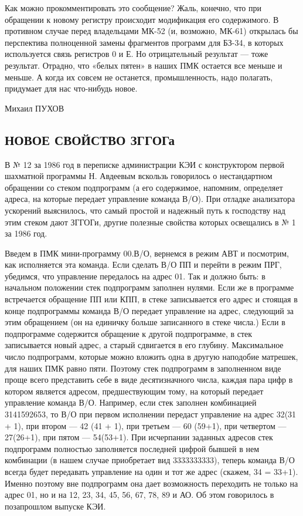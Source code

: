 \documentclass[11pt,a4paper,oneside]{article}
\begin{document}
Как можно прокомментировать это сообщение? Жаль, конечно, что при обращении к новому регистру происходит модификация его содержимого. В противном случае перед владельцами МК-52 (и, возможно, МК-61) открылась бы перспектива полноценной замены фрагментов программ для БЗ-34, в которых используется связь регистров 0 и Е. Но отрицательный результат — тоже результат. Отрадно, что «белых пятен» в наших ПМК остается все меньше и меньше. А когда их совсем не останется, промышленность, надо полагать, придумает для нас что-нибудь новое.

Михаил ПУХОВ

\subsection{НОВОЕ СВОЙСТВО ЗГГОГа}
В № 12 за 1986 год в переписке администрации КЭИ с конструктором первой шахматной программы Н. Авдеевым вскользь говорилось о нестандартном обращении со стеком подпрограмм (а его содержимое, напомним, определяет адреса, на которые передает управление команда В/О). При отладке анализатора ускорений выяснилось, что самый простой и надежный путь к господству над этим стеком дают ЗГГОГи, другие полезные свойства которых освещались в № 1 за 1986 год.

Введем в ПМК мини-программу 00.В/О, вернемся в режим АВТ и посмотрим, как исполняется эта команда. Если сделать В/О ПП и перейти в режим ПРГ, убедимся, что управление передалось на адрес 01. Так и должно быть: в начальном положении стек подпрограмм заполнен нулями. Если же в программе встречается обращение ПП или КПП, в стеке записывается его адрес и стоящая в конце подпрограммы команда В/О передает управление на адрес, следующий за этим обращением (он на единичку больше записанного в стеке числа.) Если в подпрограмме содержится обращение к другой подпрограмме, в стек записывается новый адрес, а старый сдвигается в его глубину. Максимальное число подпрограмм, которые можно вложить одна в другую наподобие матрешек, для наших ПМК равно пяти. Поэтому стек подпрограмм в заполненном виде проще всего представить себе в виде десятизначного числа, каждая пара цифр в котором является адресом, предшествующим тому, на который передает управление команда В/О. Например, если стек заполнен комбинацией 3141592653, то В/О при первом исполнении передаст управление на адрес 32(31 + 1), при втором — 42 (41 + 1), при третьем — 60 (59+1), при четвертом — 27(26+1), при пятом — 54(53+1). При исчерпании заданных адресов стек подпрограмм полностью заполняется последней цифрой бывшей в нем комбинации (в нашем случае приобретает вид 3333333333), теперь команда В/О всегда будет передавать управление на один и тот же адрес (скажем, 34 = 33+1). Именно поэтому вне подпрограмм она дает возможность переходить не только на адрес 01, но и на 12, 23, 34, 45, 56, 67, 78, 89 и АО. Об этом говорилось в позапрошлом выпуске КЭИ.
\end{document}
